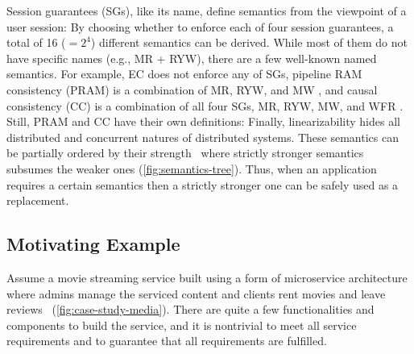 Session guarantees (SGs), like its name, define semantics from the
viewpoint of a user session:
By choosing whether to enforce each of four session guarantees, a
total of 16 ($=2^4$) different semantics can be derived. While most
of them do not have specific names (e.g., MR + RYW), there are a few
well-known named semantics. For example, EC does not enforce any of
SGs, pipeline RAM consistency (PRAM) is a combination of MR, RYW, and
MW \cite{brzezinski2004session}, and causal consistency (CC) is a
combination of all four SGs, MR, RYW, MW, and
WFR \cite{sessiontocausal}. Still, PRAM \cite{pram} and
CC \cite{causaldef} have their own definitions:
Finally, linearizability hides all distributed and concurrent natures
of distributed systems.
These semantics can be partially ordered by their
strength~\cite{viotti2016consistency} where strictly stronger
semantics subsumes the weaker ones (\cref{fig:semantics-tree}). Thus,
when an application requires a certain semantics then a strictly
stronger one can be safely used as a replacement.

\subsection{Motivating Example}
\label{subsec:eg}
Assume a movie streaming service built using a form of
microservice architecture where admins manage the serviced
content and clients rent movies and leave reviews~\cite{gan2019an}
(\cref{fig:case-study-media}).
There are quite a few functionalities and components to build the
service, and it is nontrivial to meet all service requirements
and to guarantee that all requirements are fulfilled.

